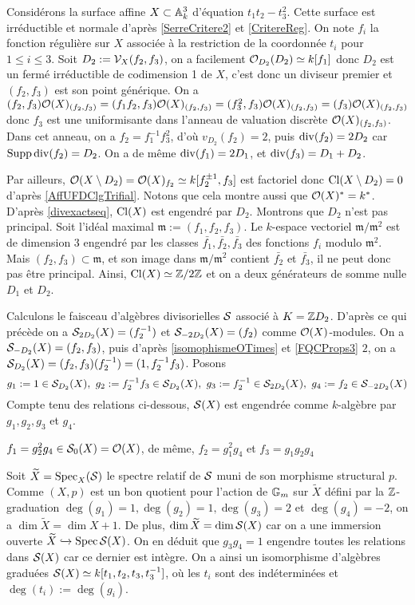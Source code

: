 \begin{ex}
Considérons la surface affine $X\subset \mathbb{A}_k^3$ d'équation $t_1t_2-t_3^2$. Cette surface est irréductible et normale d'après \ref{SerreCritere2} et \ref{CritereReg}. On note $f_i$ la fonction régulière sur $X$ associée à la restriction de la coordonnée $t_i$ pour $1\leq i\leq 3$. Soit $D_2:=\mathcal{V}_X(f_2,f_3)$, on a facilement $\mathcal{O}_{D_2}(D_2)\simeq k[f_1]$ donc $D_2$ est un fermé irréductible de codimension 1 de $X$, c'est donc un diviseur premier et $(f_2,f_3)$ est son point générique. On a $(f_2,f_3)\mathcal{O}(X)_{(f_2,f_3)}=(f_1f_2,f_3)\mathcal{O}(X)_{(f_2,f_3)}=(f_3^2,f_3)\mathcal{O}(X)_{(f_2,f_3)}=(f_3)\mathcal{O}(X)_{(f_2,f_3)}$ donc $f_3$ est une uniformisante dans l'anneau de valuation discrète $\mathcal{O}(X)_{(f_2,f_3)}$. Dans cet anneau, on a $f_2=f_1^{-1}f_3^2$, d'où $v_{D_2}(f_2)=2$, puis $\operatorname{div}(f_2)=2D_2$ car $\operatorname{Supp} \operatorname{div}(f_2)=D_2$. On a de même $\operatorname{div}(f_1)=2D_1$, et $\operatorname{div}(f_3)=D_1+D_2$.

Par ailleurs, $\mathcal{O}(X\setminus D_2)=\mathcal{O}(X)_{f_2}\simeq k[f_2^{\pm 1},f_3]$ est factoriel donc $\operatorname{Cl}(X\setminus D_2)=0$ d'après \ref{AffUFDClgTrifial}. Notons que cela montre aussi que $\mathcal{O}(X)^*=k^*$. D'après \ref{divexactseq}, $\operatorname{Cl}(X)$ est engendré par $D_2$. Montrons que $D_2$ n'est pas principal. Soit l'idéal maximal $\mathfrak{m}:=(f_1,f_2,f_3)$. Le $k$-espace vectoriel $\mathfrak{m}/\mathfrak{m}^2$ est de dimension $3$ engendré par les classes $\bar{f_1},\bar{f_2},\bar{f_3}$ des fonctions $f_i$ modulo $\mathfrak{m}^2$. Mais $(f_2,f_3)\subset \mathfrak{m}$, et son image dans $\mathfrak{m}/\mathfrak{m}^2$ contient $\bar{f_2}$ et $\bar{f_3}$, il ne peut donc pas être principal. Ainsi, $\operatorname{Cl}(X)\simeq \mathbb{Z}/2\mathbb{Z}$ et on a deux générateurs de somme nulle $D_1$ et $D_2$.

Calculons le faisceau d'algèbres divisorielles $\mathcal{S}$ associé à $K=\mathbb{Z} D_2$. D'après ce qui précède on a $\mathcal{S}_{2D_2}(X)=(f_2^{-1})$ et $\mathcal{S}_{-2D_2}(X)=(f_2)$ comme $\mathcal{O}(X)$-modules. On a $\mathcal{S}_{-D_2}(X)=(f_2,f_3)$, puis d'après \ref{isomophismeOTimes} et \ref{FQCProps3} $2$, on a $\mathcal{S}_{D_2}(X)=(f_2,f_3)(f_2^{-1})=(1,f_2^{-1}f_3)$. Posons 
$$g_1:=1\in\mathcal{S}_{D_2}(X), \,\,g_2:=f_2^{-1}f_3\in\mathcal{S}_{D_2}(X),\,\,g_3:=f_2^{-1}\in \mathcal{S}_{2D_2}(X), \,\,g_4:=f_2\in\mathcal{S}_{-2D_2}(X)$$
Compte tenu des relations ci-dessous, $\mathcal{S}(X)$ est engendrée comme $k$-algèbre par $g_1,g_2,g_3$ et $g_4$.
\begin{center}
$f_1=g_2^2g_4\in\mathcal{S}_0(X)=\mathcal{O}(X)$, de même,  $f_2=g_1^2g_4$ et $f_3=g_1g_2g_4$
\end{center}
Soit $\widetilde{X}=\operatorname{Spec}_X(\mathcal{S})$ le spectre relatif de $\mathcal{S}$ muni de son morphisme structural $p$. Comme $(X,p)$ est un bon quotient pour l'action de $\mathbb{G}_m$ sur $\widetilde{X}$ défini par la $\mathbb{Z}$-graduation $\deg(g_1)=1,\deg(g_2)=1,\deg(g_3)=2$ et $\deg(g_4)=-2$, on a $\dim \widetilde{X}=\dim X+ 1$. De plus, $\dim \widetilde{X}=\dim \mathcal{S}(X)$ car on a une immersion ouverte $\widetilde{X}\xhookrightarrow{} \operatorname{Spec} \mathcal{S}(X)$. On en déduit que $g_3g_4=1$ engendre toutes les relations dans $\mathcal{S}(X)$ car ce dernier est intègre. On a ainsi un isomorphisme d'algèbres graduées $\mathcal{S}(X)\simeq k[t_1,t_2,t_3, t_3^{-1}]$, où les $t_i$ sont des indéterminées et $\deg(t_i):=\deg(g_i)$.


\end{ex}
